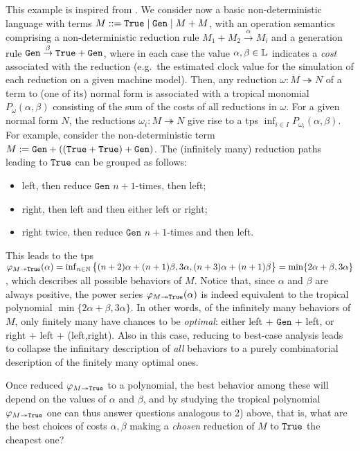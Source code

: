 This example is inspired from \cite{Manzo2013}. We consider now a basic non-deterministic language with terms $M::= \mathtt{True} \mid  \mathtt{Gen} \mid  M + M$, with an operation semantics comprising a non-deterministic reduction rule 
$M_{1}+M_{2} \stackrel{\alpha}{\to} M_{i}$ and a generation rule
$\mathtt{Gen}\stackrel{\beta}{\to} \mathtt{True} +\mathtt{Gen}$, 
where in each case the value $\alpha,\beta\in \mathbb{L}$ indicates a \emph{cost} associated with the reduction (e.g.~the estimated clock value for the simulation of each reduction on a given machine model). 
Then, any reduction $\omega: M \twoheadrightarrow N$ of a term to (one of its) normal form is  associated with a tropical monomial $P_{\omega}( \alpha,\beta)$ consisting of the sum of the costs of all reductions in $\omega$. For a given normal form $N$, the reductions $\omega_{i}: M \twoheadrightarrow N$ give rise to a tps $\inf_{i\in I}P_{\omega_{i}}( \alpha,\beta)$. 
For example, consider the non-deterministic term
$
M :=\mathtt{Gen}+  ((\mathtt{True} + \mathtt{True}) + \mathtt{Gen})
$. 
The (infinitely many) reduction paths leading to $\mathtt{True}$ can be grouped as follows:
\begin{itemize}
\item left, then reduce $\mathtt{Gen}$ $n+1$-times, then left;
\item right, then left and then either left or right;
\item right twice, then reduce $\mathtt{Gen}$ $n+1$-times and then left.
\end{itemize}
This leads to the tps 
$\varphi_{M\twoheadrightarrow \mathtt{True}}(\alpha)=\inf_{n\in \mathbb N}\big\{(n+2)\alpha+(n+1)\beta, 3\alpha, (n+3)\alpha+(n+1)\beta\big \}= \min\{ 2\alpha+\beta, 3\alpha\}$, which describes all possible behaviors of $M$. Notice that, since $\alpha$ and $\beta$ are always positive, the power series $\varphi_{M\twoheadrightarrow\mathtt{True}}(\alpha)$ is indeed equivalent to the tropical polynomial $\min\{ 2\alpha+\beta, 3\alpha\}$. In other words, of the infinitely many behaviors of $M$, only finitely many have chances to be \emph{optimal}: either left + $\mathtt{Gen}$ + left, or right + left + (left,right). Also in this case, reducing to best-case analysis leads to collapse the infinitary description of \emph{all} behaviors to a purely combinatorial description of the finitely many optimal ones. 

Once reduced $\varphi_{M\twoheadrightarrow\mathtt{True}}$ to a polynomial, the best behavior among these will depend on the values of $\alpha$ and $\beta$, and by studying the tropical polynomial $\varphi_{M\twoheadrightarrow\mathtt{True}}$ one can thus answer questions analogous to 2) above, that is, what are the best choices of costs $\alpha,\beta$ making a \emph{chosen} reduction of $M$ to $\mathtt{True}$ the cheapest one?



















